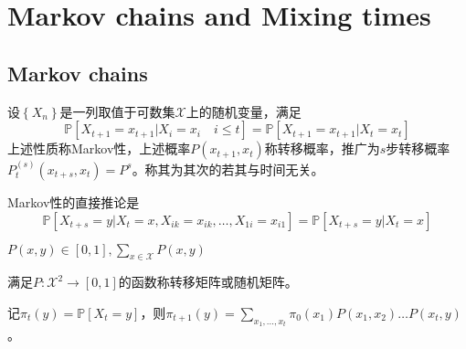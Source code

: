 \documentclass{ctexart}
\begin{document}
\section{Markov chains and Mixing times}

\subsection{Markov chains}
设$\left\{ X_n \right\}$是一列取值于可数集$\mathcal{X}$上的随机变量，满足
\begin{equation*}
\mathbb{P}\left[ X_{t+1}=x_{t+1}| X_i=x_i \quad i\leq t\right]= \mathbb{P}\left[ X_{t+1}=x_{t+1}| X_t=x_t \right]
\end{equation*}
上述性质称Markov性，上述概率$P(x_{t+1},x_t)$称转移概率，推广为$s$步转移概率$P^{(s)}_t(x_{t+s},x_{t})=P^{s}$。称其为其次的若其与时间无关。

Markov性的直接推论是
\begin{equation*}
\mathbb{P}\left[ X_{t+s}=y|X_t=x, X_{ik}=x_{ik},\dots, X_{1i}=x_{i1} \right]=\mathbb{P}\left[ X_{t+s}=y| X_t=x \right]
\end{equation*}

$P(x,y)\in [0,1], \sum\limits_{x\in \mathcal{X}}^{}P(x,y)$

满足$P: \mathcal{X}^{2}\to [0,1]$的函数称转移矩阵或随机矩阵。

记$\pi_t(y)=\mathbb{P}\left[ X_t=y \right]$，则$\pi_{t+1}(y)=\sum\limits_{x_1,\dots, x_t}^{}\pi_0(x_1)P(x_1,x_2)\dots P(x_t,y)$。
\end{document}
